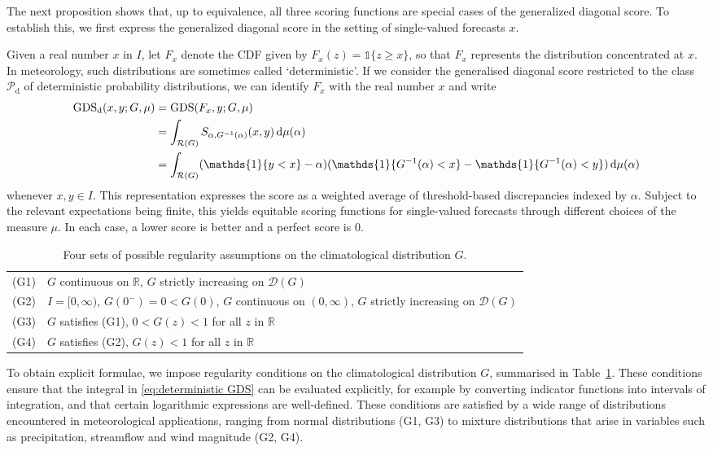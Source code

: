 \documentclass[10pt]{article} %
\theoremstyle{theorem}
\theoremstyle{definition}
\newcommand{\RRR}{\mathbb{R}}
\newcommand{\dd}{\mathrm{d}}
\newcommand{\one}{\mathds{1}}
\newcommand{\GDS}{\mathrm{GDS}}
\newcommand{\GDSd}{\mathrm{GDS}_\mathrm{d}}
\newcommand{\RG}{\mathcal{R}(G)}
\begin{document}
The next proposition shows that, up to equivalence, all three scoring functions are special cases of the generalized diagonal score. To establish this, we first express the generalized diagonal score in the setting of single-valued forecasts $x$.

Given a real number $x$ in $I$, let $F_x$ denote the CDF given by $F_x(z)=\one\{z\geq x\}$, so that $F_x$ represents the distribution concentrated at $x$. In meteorology, such distributions are sometimes called `deterministic'. If we consider the generalised diagonal score restricted to the class $\mathcal{P}_\mathrm{d}$ of deterministic probability distributions, we can identify $F_x$ with the real number $x$ and write
\begin{align}
\GDSd(x,y;G,\mu)
&= \GDS(F_x,y;G,\mu) \notag\\
&= \int_{\RG} S_{\alpha,G^{-1}(\alpha)}(x,y)\,\dd\mu(\alpha) \notag \\
&=  \int_{\RG}  (\one\{y<x\} - \alpha)(\one\{G^{-1}(\alpha) < x\} - \one\{G^{-1}(\alpha) < y\}) \,\dd\mu(\alpha) \label{eq:deterministic GDS}
\end{align}
whenever $x,y\in I$. This representation expresses the score as a weighted average of threshold-based discrepancies indexed by $\alpha$.
Subject to the relevant expectations being finite, this yields equitable scoring functions for single-valued forecasts through different choices of the measure $\mu$. In each case, a lower score is better and a perfect score is $0$.

\begin{table}[t!]
    \renewcommand{\arraystretch}{1.5} %
    \centering \small
    \begin{tabular}{|cl|}
    \hline
        (G1) & $G$ continuous on $\RRR$, $G$ strictly increasing on $\mathcal{D}(G)$ \\ 
        (G2) & $I=[0,\infty)$, $G(0^-)=0<G(0)$, $G$ continuous on $(0,\infty)$, $G$ strictly increasing on $\mathcal{D}(G)$ \\
        (G3) & $G$ satisfies (G1), $0<G(z)<1$ for all $z$ in $\RRR$ \\
        (G4) & $G$ satisfies (G2), $G(z)<1$ for all $z$ in $\RRR$ \\
    \hline
    \end{tabular}
    \caption{Four sets of possible regularity assumptions on the climatological distribution $G$.}
    \label{tab:regularity}
\end{table}

To obtain explicit formulae, we impose regularity conditions on the climatological distribution $G$, summarised in Table~\ref{tab:regularity}. These conditions ensure that the integral in \eqref{eq:deterministic GDS} can be evaluated explicitly, for example by converting indicator functions into intervals of integration, and that certain logarithmic expressions are well-defined. These conditions are satisfied by a wide range of distributions encountered in meteorological applications, ranging from normal distributions (G1, G3) to mixture distributions that arise in variables such as precipitation, streamflow and wind magnitude (G2, G4).
\end{document}
